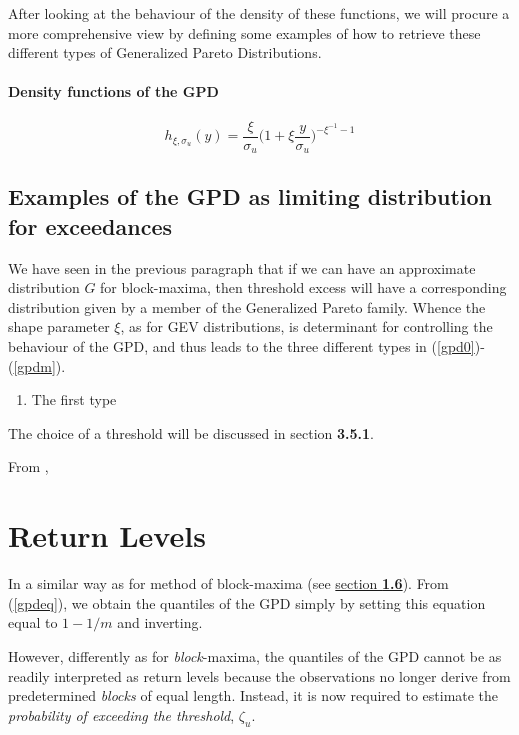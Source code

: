 \documentclass[11pt,a4paper,openany ]{book}
\begin{document}
After looking at the behaviour of the density of these functions, we will procure a more comprehensive view by defining some examples of how to retrieve these different types of Generalized Pareto Distributions.

\paragraph{Density functions of the GPD  }


\begin{equation}\label{densgpd}
h_{\xi,\sigma_u}(y)=\frac{\xi}{\sigma_u}\bigg(1+\xi\frac{y}{\sigma_u}\bigg)^{-\xi^{-1}-1}
\end{equation}



\subsection{Examples of the GPD as limiting distribution for exceedances }
We have seen in the previous paragraph that if we can have an approximate distribution $G$ for block-maxima, then threshold excess will have a corresponding distribution given by a member of the Generalized Pareto family. Whence the shape parameter $\xi$, as for GEV distributions, is determinant for controlling the behaviour of the
GPD, and thus leads to the three different types in (\ref{gpd0})-(\ref{gpdm}). 

\begin{enumerate}
	\item The first type 
	
\end{enumerate}



The choice of a threshold will be discussed in section \textbf{3.5.1}.

From \cite[p.147-]{beirlant_statistics_2006},


\section{Return Levels}

In a similar way as for method of block-maxima (see \hyperref[rlgev]{section \textbf{1.6}}).
From (\ref{gpdeq}), we obtain the quantiles of the GPD simply by setting this equation equal to $1-1/m$ and inverting.

However, differently as for \emph{block}-maxima, the quantiles of the GPD cannot be as readily interpreted as return levels because the observations no longer derive from predetermined \emph{blocks} of equal length. Instead, it is now required to estimate the \emph{probability of exceeding the threshold}, $\zeta_u$.
\end{document}
